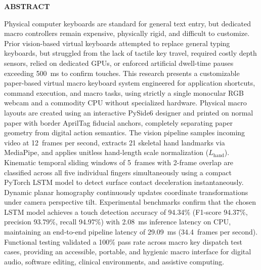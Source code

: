 \thispagestyle{plain}
\begin{center}
    \vspace*{1.0cm}
    {\fontsize{14pt}{18pt}\selectfont \textbf{ABSTRACT}\par}
    \vspace{1.5cm}
\end{center}

\noindent Physical computer keyboards are standard for general text entry, but dedicated macro controllers remain expensive, physically rigid, and difficult to customize. Prior vision-based virtual keyboards attempted to replace general typing keyboards, but struggled from the lack of tactile key travel, required costly depth sensors, relied on dedicated GPUs, or enforced artificial dwell-time pauses exceeding 500~ms to confirm touches. This research presents a customizable paper-based virtual macro keyboard system engineered for application shortcuts, command execution, and macro tasks, using strictly a single monocular RGB webcam and a commodity CPU without specialized hardware. Physical macro layouts are created using an interactive PySide6 designer and printed on normal paper with border AprilTag fiducial anchors, completely separating paper geometry from digital action semantics. The vision pipeline samples incoming video at 12~frames per second, extracts 21 skeletal hand landmarks via MediaPipe, and applies unitless hand-length scale normalization ($L_{\text{hand}}$). Kinematic temporal sliding windows of 5~frames with 2-frame overlap are classified across all five individual fingers simultaneously using a compact PyTorch LSTM model to detect surface contact deceleration instantaneously. Dynamic planar homography continuously updates coordinate transformations under camera perspective tilt. Experimental benchmarks confirm that the chosen LSTM model achieves a touch detection accuracy of 94.34\% (F1-score 94.37\%, precision 93.79\%, recall 94.97\%) with 2.08~ms inference latency on CPU, maintaining an end-to-end pipeline latency of 29.09~ms (34.4~frames per second). Functional testing validated a 100\% pass rate across macro key dispatch test cases, providing an accessible, portable, and hygienic macro interface for digital audio, software editing, clinical environments, and assistive computing.

